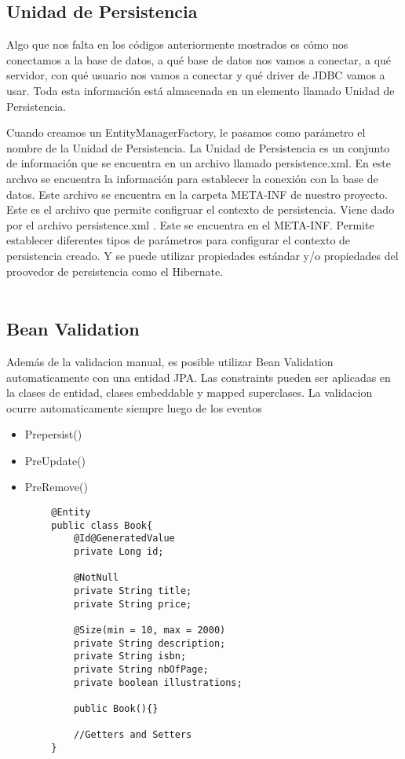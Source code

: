 \documentclass{article}
\begin{document}
\subsection*{Unidad de Persistencia}

Algo que nos falta en los códigos anteriormente mostrados es cómo nos conectamos a la base de datos, a qué base de datos nos vamos a conectar, a qué servidor,
con qué usuario nos vamos a conectar y qué driver de JDBC vamos a usar. Toda esta información está almacenada en un elemento llamado Unidad de Persistencia.

Cuando creamos un EntityManagerFactory, le pasamos como parámetro el nombre de la Unidad de Persistencia. La Unidad de Persistencia es un conjunto de información
que se encuentra en un archivo llamado persistence.xml. En este archvo se encuentra la información para establecer la conexión con la base de datos.
Este archivo se encuentra en la carpeta META-INF de nuestro proyecto. Este es el archivo que permite configruar el contexto de persistencia. Viene dado por el archivo
persistence.xml . Este se encuentra en el META-INF. Permite establecer diferentes tipos de parámetros para configurar el contexto de persistencia creado. Y se puede utilizar
propiedades estándar y/o propiedades del proovedor de persistencia como el Hibernate. \\\\

\subsection*{Bean Validation}
Además de la validacion manual, es posible utilizar Bean Validation automaticamente con una entidad JPA. Las constraints pueden ser aplicadas en la clases de entidad,
clases embeddable y mapped superclases. La validacion ocurre automaticamente siempre luego de los eventos
\begin{itemize}
	\item Prepersist()
	\item PreUpdate()
	\item PreRemove()
\end{itemize}

\begin{lstlisting}
        @Entity
        public class Book{
            @Id@GeneratedValue
            private Long id; 

            @NotNull
            private String title;
            private String price; 

            @Size(min = 10, max = 2000)
            private String description;
            private String isbn;
            private String nbOfPage;
            private boolean illustrations;

            public Book(){}

            //Getters and Setters
        }
    \end{lstlisting}
\end{document}
